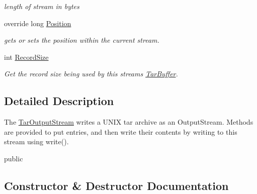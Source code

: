 \begin{DoxyCompactItemize}
\begin{DoxyCompactList}\small\item\em length of stream in bytes \end{DoxyCompactList}\item 
override long \hyperlink{class_i_c_sharp_code_1_1_sharp_zip_lib_1_1_tar_1_1_tar_output_stream_a26768b9e2b18348bce38500be10bb534}{Position}
\begin{DoxyCompactList}\small\item\em gets or sets the position within the current stream. \end{DoxyCompactList}\item 
int \hyperlink{class_i_c_sharp_code_1_1_sharp_zip_lib_1_1_tar_1_1_tar_output_stream_af34a2b2ebc3683585a981e8224e06ec8}{Record\+Size}
\begin{DoxyCompactList}\small\item\em Get the record size being used by this stream\textquotesingle{}s \hyperlink{class_i_c_sharp_code_1_1_sharp_zip_lib_1_1_tar_1_1_tar_buffer}{Tar\+Buffer}. \end{DoxyCompactList}\end{DoxyCompactItemize}


\subsection{Detailed Description}
The \hyperlink{class_i_c_sharp_code_1_1_sharp_zip_lib_1_1_tar_1_1_tar_output_stream}{Tar\+Output\+Stream} writes a U\+N\+IX tar archive as an Output\+Stream. Methods are provided to put entries, and then write their contents by writing to this stream using write(). 

public 

\subsection{Constructor \& Destructor Documentation}
\mbox{\label{class_i_c_sharp_code_1_1_sharp_zip_lib_1_1_tar_1_1_tar_output_stream_a9c324e179a9735fd0c3c128bbc704c7c}} 
